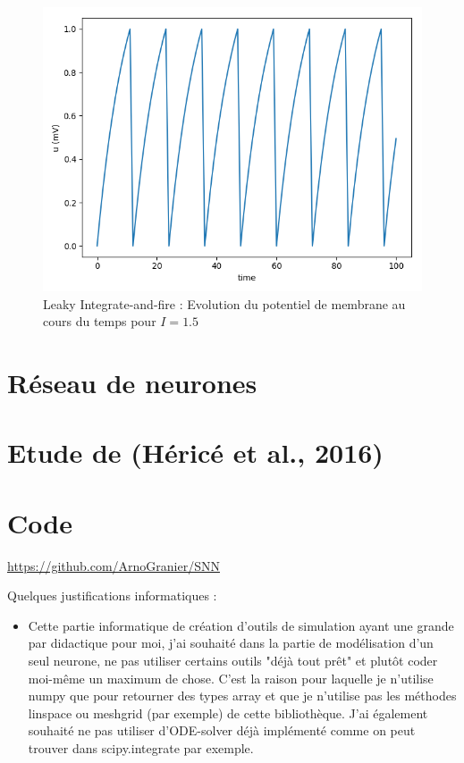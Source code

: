 \documentclass[12pt]{scrartcl}
\begin{document}
\begin{figure}[!h]
\centering
\includegraphics[scale=0.5]{imgs/liaf.png}
\caption{Leaky Integrate-and-fire : Evolution du potentiel de membrane au cours du temps pour $I = 1.5$}
\label{liaf}
\end{figure}

\pagebreak

\part{Réseau de neurones}

\part{Etude de (Héricé et al., 2016) }

\part{Code}
\url{https://github.com/ArnoGranier/SNN}

Quelques justifications informatiques :
\begin{itemize} \item Cette partie informatique de création d'outils de simulation ayant une grande par didactique pour moi, j'ai souhaité dans la partie de modélisation d'un seul neurone, ne pas utiliser certains outils "déjà tout prêt" et plutôt coder moi-même un maximum de chose. C'est la raison pour laquelle je n'utilise numpy que pour retourner des types array et que je n'utilise pas les méthodes linspace ou meshgrid (par exemple) de cette bibliothèque. J'ai également souhaité ne pas utiliser d'ODE-solver déjà implémenté comme on peut trouver dans scipy.integrate par exemple. \end{itemize}


\nocite{*}



\end{document}
